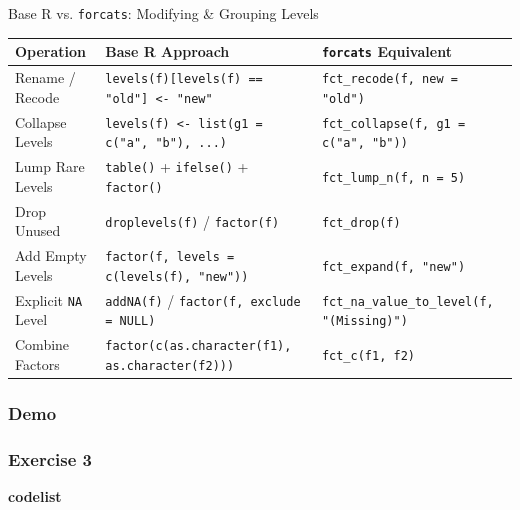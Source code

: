 \documentclass[aspectratio=1610]{beamer}
\newcommand{\rcode}[1]{\texttt{\footnotesize #1}}
\begin{document}
\begin{frame}[fragile]{Base R vs. \texttt{forcats}: Modifying \& Grouping Levels}
  \centering
  \footnotesize
  \renewcommand{\arraystretch}{1.3}
  \begin{tabular}{@{} l p{5.4cm} l @{}}
    \toprule
    \textbf{Operation} & \textbf{Base R Approach} & \textbf{\texttt{forcats} Equivalent} \\
    \midrule
    Rename / Recode & \rcode{levels(f)[levels(f) == "old"] <- "new"}         & \rcode{fct\_recode(f, new = "old")} \\
    Collapse Levels & \rcode{levels(f) <- list(g1 = c("a", "b"), ...)}       & \rcode{fct\_collapse(f, g1 = c("a", "b"))} \\
    Lump Rare Levels & \rcode{table()} + \rcode{ifelse()} + \rcode{factor()} & \rcode{fct\_lump\_n(f, n = 5)} \\
    Drop Unused & \rcode{droplevels(f)} / \rcode{factor(f)}                  & \rcode{fct\_drop(f)} \\
    Add Empty Levels & \rcode{factor(f, levels = c(levels(f), "new"))}       & \rcode{fct\_expand(f, "new")} \\
    Explicit \texttt{NA} Level & \rcode{addNA(f)} / \rcode{factor(f, exclude = NULL)} & \rcode{fct\_na\_value\_to\_level(f, "(Missing)")} \\
    Combine Factors & \rcode{factor(c(as.character(f1), as.character(f2)))}  & \rcode{fct\_c(f1, f2)} \\
    \bottomrule
  \end{tabular}
\end{frame}


\begin{frame}
  \frametitle{Demo}
\end{frame}

\begin{frame}
  \frametitle{Exercise 3}
\end{frame}

\invert
\begin{frame}
   \LARGE \textbf{codelist}
   \par
\end{frame}
\revert
\end{document}
